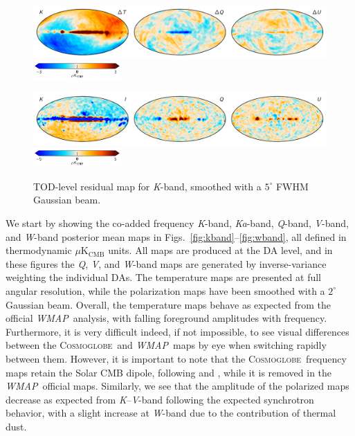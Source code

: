 \documentclass[twocolumn]{../../common/aa}
\def\WMAP{\emph{WMAP}}
\def\WMAPnine{\emph{WMAP9}}
\newcommand{\cosmoglobe}{\textsc{Cosmoglobe}}
\newcommand{\K}[0]{\textit K}
\newcommand{\Ka}[0]{\textit{Ka}}
\newcommand{\Q}[0]{\textit Q}
\newcommand{\V}[0]{\textit V}
\newcommand{\W}[0]{\textit W}
\begin{document}
\begin{figure}[t]
	\centering
	\includegraphics[width=\textwidth]{figures/023-WMAP_K_sampdiff.pdf}\\
	\includegraphics[width=0.30\textwidth]{figures/cbar_3uK.pdf}        
	\caption{Difference between two \K-band Gibbs samples, smoothed to $7^\circ$.}
        \label{fig:Ksampdiff}

	\centering
	\includegraphics[width=\textwidth]{figures/tod_res_K_IQU.pdf}\\
	\includegraphics[width=0.30\textwidth]{figures/cbar_5uK.pdf}
	\caption{TOD-level residual map for \K-band, smoothed with a $5^\circ$ FWHM Gaussian beam.}
        \label{fig:todres_K}
\end{figure}

We start by showing the co-added frequency \K-band, \Ka-band, \Q-band, \V-band, and \W-band posterior mean maps in Figs.~\ref{fig:kband}--\ref{fig:wband}, all defined in thermodynamic  $\mu\mathrm{K_{CMB}}$ units. All maps are produced at the DA level, and in these figures the \Q, \V, and \W-band maps are generated by inverse-variance weighting the individual DAs. The temperature maps are presented at full angular resolution, while the polarization maps have been smoothed with a $2^\circ$ Gaussian beam. Overall, the temperature maps behave as expected from the official \WMAP\ analysis, with falling foreground amplitudes with frequency. Furthermore, it is very difficult indeed, if not impossible, to see visual differences between the \cosmoglobe\ and \WMAP\ maps by eye when switching rapidly between them. However, it is important to note that the \cosmoglobe\ frequency maps retain the Solar CMB dipole, following \citet{npipe} and \citet{bp01}, while it is removed in the \WMAP\ official maps. Similarly, we see that the amplitude of the polarized maps decrease as expected from \K--\V-band following the expected synchrotron behavior, with a slight increase at \W-band due to the contribution of thermal dust. %
\end{document}
